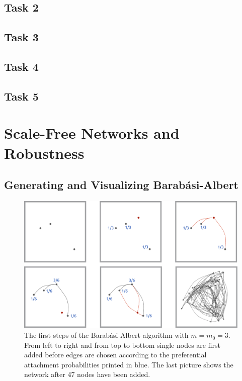 \documentclass{scrartcl}
\begin{document}
\subsection{Task 2}
\subsection{Task 3}
\subsection{Task 4}
\subsection{Task 5}

\section{Scale-Free Networks and Robustness}
\subsection{Generating and Visualizing Barab\'asi-Albert}

\begin{figure}
    \includegraphics[width=\textwidth]{pictures/21_begin.pdf}
    \caption{The first steps of the Barab\'asi-Albert algorithm with $m
    = m_0 = 3$. From left to right and from top to bottom single nodes are
    first added before edges are chosen according to the preferential
    attachment probabilities printed in blue. The last picture shows the network
    after 47 nodes have been added.}
    \label{fig:21_begin}
\end{figure}
\end{document}
